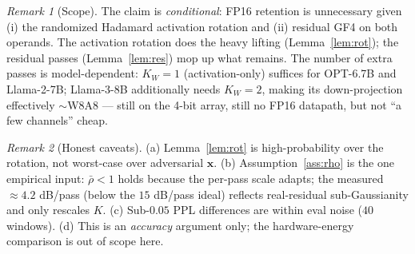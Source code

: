 \documentclass[11pt]{article}
\theoremstyle{remark}
\newtheorem{remark}{Remark}
\begin{document}
\begin{remark}[Scope]
The claim is \emph{conditional}: FP16 retention is unnecessary given (i) the
randomized Hadamard activation rotation and (ii) residual GF4 on both operands.
The activation rotation does the heavy lifting (Lemma~\ref{lem:rot}); the
residual passes (Lemma~\ref{lem:res}) mop up what remains. The number of extra
passes is model-dependent: $K_W{=}1$ (activation-only) suffices for OPT-6.7B and
Llama-2-7B; Llama-3-8B additionally needs $K_W{=}2$, making its down-projection
effectively $\sim$W8A8 --- still on the 4-bit array, still no FP16 datapath, but
not ``a few channels'' cheap.
\end{remark}

\begin{remark}[Honest caveats]
(a) Lemma~\ref{lem:rot} is high-probability over the rotation, not worst-case
over adversarial $\bm x$. (b) Assumption~\ref{ass:rho} is the one empirical input:
$\bar\rho<1$ holds because the per-pass scale adapts; the measured $\approx4.2$
dB/pass (below the $15$ dB/pass ideal) reflects real-residual sub-Gaussianity and
only rescales $K$. (c) Sub-$0.05$ PPL differences are within eval noise ($40$
windows). (d) This is an \emph{accuracy} argument only; the hardware-energy
comparison is out of scope here.
\end{remark}
\end{document}
